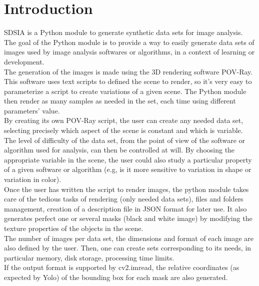 \section*{Introduction}

SDSIA is a Python module to generate synthetic data sets for image analysis.\\

The goal of the Python module is to provide a way to easily generate data sets of images used by image analysis softwares or algorithms, in a context of learning or development.\\

The generation of the images is made using the 3D rendering software POV-Ray. This software uses text scripts to defined the scene to render, so it's very easy to parameterize a script to create variations of a given scene. The Python module then render as many samples as needed in the set, each time using different parameters' value.\\

By creating its own POV-Ray script, the user can create any needed data set, selecting precisely which aspect of the scene is constant and which is variable. The level of difficulty of the data set, from the point of view of the software or algorithm used for analysis, can then be controlled at will. By choosing the appropriate variable in the scene, the user could also study a particular property of a given software or algorithm (e.g, is it more sensitive to variation in shape or variation in color).\\

Once the user has written the script to render images, the python module takes care of the tedious tasks of rendering (only needed data sets), files and folders management, creation of a description file in JSON format for later use. It also generates perfect one or several masks (black and white image) by modifying the texture properties of the objects in the scene.\\

The number of images per data set, the dimensions and format of each image are also defined by the user. Then, one can create sets corresponding to its needs, in particular memory, disk storage, processing time limits.\\

If the output format is supported by cv2.imread, the relative coordinates (as expected by Yolo) of the bounding box for each mask are also generated.\\

